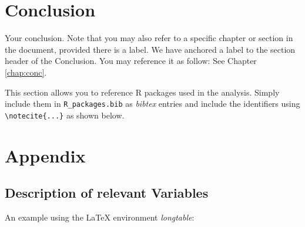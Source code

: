 \documentclass[11pt,a4paper]{article}
\begin{document}
\pagebreak

\hypertarget{conclusion}{%
\section{\texorpdfstring{Conclusion
\label{chap:conc}}{Conclusion }}\label{conclusion}}

Your conclusion. Note that you may also refer to a specific chapter or
section in the document, provided there is a label. We have anchored a
label to the section header of the Conclusion. You may reference it as
follow: See Chapter \ref{chap:conc}.

This section allows you to reference R packages used in the analysis.
Simply include them in \texttt{R\_packages.bib} as \emph{bibtex} entries
and include the identifiers using
\texttt{\textbackslash{}notecite\{...\}} as shown below.

\pagebreak

\printbibliography[title = References]
\cleardoublepage

\begin{refsection}
\nocite{R-base}
\nocite{R-Studio}

\printbibliography[title = Software-References]
\end{refsection}

\cleardoublepage
\appendix
\setcounter{table}{0}
\setcounter{figure}{0}
\renewcommand{\thetable}{A\arabic{table}}
\renewcommand{\thefigure}{A\arabic{figure}}


\hypertarget{appendix}{%
\section{Appendix}\label{appendix}}

\hypertarget{description-of-relevant-variables}{%
\subsection{\texorpdfstring{Description of relevant Variables
\label{app:A}}{Description of relevant Variables }}\label{description-of-relevant-variables}}

An example using the LaTeX environment \emph{longtable}:
\end{document}
